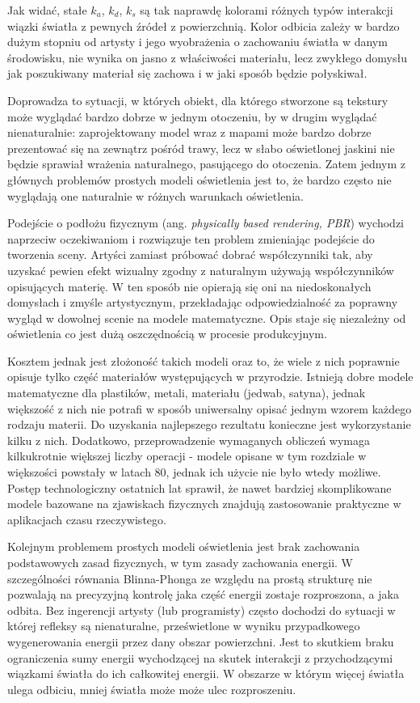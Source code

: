 \documentclass[../main.tex]{subfiles}
\begin{document}
Jak widać, stałe $k_a$, $k_d$, $k_s$ są tak naprawdę kolorami różnych typów interakcji
wiązki światła z pewnych źródeł z powierzchnią. Kolor odbicia zależy w bardzo
dużym stopniu od artysty i jego wyobrażenia o zachowaniu światła w danym
środowisku, nie wynika on jasno z właściwości materiału, lecz zwykłego domysłu
jak poszukiwany materiał się zachowa i w jaki sposób będzie połyskiwał.

Doprowadza to sytuacji, w których obiekt, dla którego stworzone są tekstury
może wyglądać bardzo dobrze w jednym otoczeniu, by w drugim wyglądać
nienaturalnie: zaprojektowany model wraz z mapami może bardzo dobrze
prezentować się na zewnątrz pośród trawy, lecz w słabo oświetlonej jaskini nie
będzie sprawiał wrażenia naturalnego, pasującego do otoczenia. Zatem jednym z
głównych problemów prostych modeli oświetlenia jest to, że bardzo często nie
wyglądają one naturalnie w różnych warunkach oświetlenia.

Podejście o podłożu fizycznym (ang. \textit{physically based rendering, PBR}) wychodzi naprzeciw oczekiwaniom i rozwiązuje ten problem
zmieniając podejście do tworzenia sceny. Artyści zamiast próbować dobrać
współczynniki tak, aby uzyskać pewien efekt wizualny zgodny z naturalnym
używają współczynników opisujących materię. W ten sposób nie opierają się oni
na niedoskonałych domysłach i zmyśle artystycznym, przekładając
odpowiedzialność za poprawny wygląd w dowolnej scenie na modele matematyczne.
Opis staje się niezależny od oświetlenia co jest dużą oszczędnością w procesie
produkcyjnym.

Kosztem jednak jest złożoność takich modeli oraz to, że wiele z nich poprawnie opisuje tylko część materiałów występujących w przyrodzie. Istnieją dobre modele matematyczne dla plastików, metali, materiału (jedwab, satyna), jednak większość z nich nie potrafi w sposób uniwersalny opisać jednym wzorem każdego rodzaju materii. Do uzyskania najlepszego rezultatu konieczne jest wykorzystanie kilku z nich.
Dodatkowo, przeprowadzenie wymaganych obliczeń wymaga kilkukrotnie
większej liczby operacji - modele opisane w tym rozdziale w większości powstały
w latach 80, jednak ich użycie nie było wtedy możliwe. Postęp technologiczny 
ostatnich lat sprawił, że nawet bardziej skomplikowane modele bazowane na zjawiskach fizycznych znajdują zastosowanie praktyczne w aplikacjach czasu rzeczywistego.

Kolejnym problemem prostych modeli oświetlenia jest brak zachowania
podstawowych zasad fizycznych, w tym zasady zachowania energii. W szczególności
równania Blinna-Phonga ze względu na prostą strukturę nie pozwalają na
precyzyjną kontrolę jaka część energii zostaje rozproszona, a jaka odbita. Bez
ingerencji artysty (lub programisty) często dochodzi do sytuacji w której
refleksy są nienaturalne, prześwietlone w wyniku przypadkowego wygenerowania 
energii przez dany obszar powierzchni. Jest to skutkiem braku ograniczenia 
sumy energii wychodzącej na skutek interakcji z przychodzącymi wiązkami światła 
do ich całkowitej energii. W obszarze w którym więcej światła ulega odbiciu, mniej
światła może może ulec rozproszeniu.
\end{document}
